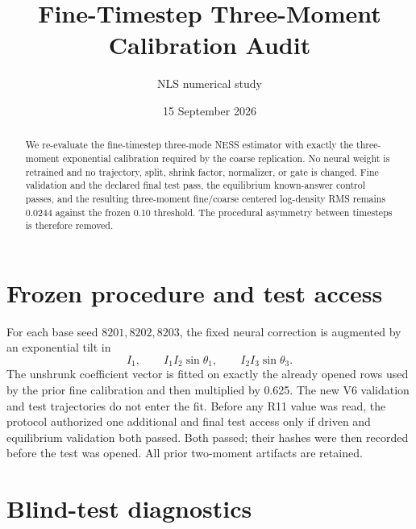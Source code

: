 \documentclass[11pt]{article}
\title{Fine-Timestep Three-Moment Calibration Audit}
\author{NLS numerical study}
\date{15 September 2026}
\begin{document}
\maketitle

\begin{abstract}
We re-evaluate the fine-timestep three-mode NESS estimator with exactly the
three-moment exponential calibration required by the coarse replication.  No
neural weight is retrained and no trajectory, split, shrink factor, normalizer,
or gate is changed.  Fine validation and the declared final test pass, the
equilibrium known-answer control passes, and the resulting three-moment
fine/coarse centered log-density RMS remains 0.0244 against the frozen 0.10
threshold.  The procedural asymmetry between timesteps is therefore removed.
\end{abstract}

\section{Frozen procedure and test access}

For each base seed $8201,8202,8203$, the fixed neural correction is augmented
by an exponential tilt in
\[
 I_1,\qquad I_1I_2\sin\theta_1,\qquad I_2I_3\sin\theta_3.
\]
The unshrunk coefficient vector is fitted on exactly the already opened rows
used by the prior fine calibration and then multiplied by 0.625.  The new V6
validation and test trajectories do not enter the fit.  Before any R11 value
was read, the protocol authorized one additional and final test access only if
driven and equilibrium validation both passed.  Both passed; their hashes were
then recorded before the test was opened.  All prior two-moment artifacts are
retained.

\section{Blind-test diagnostics}
\end{document}
